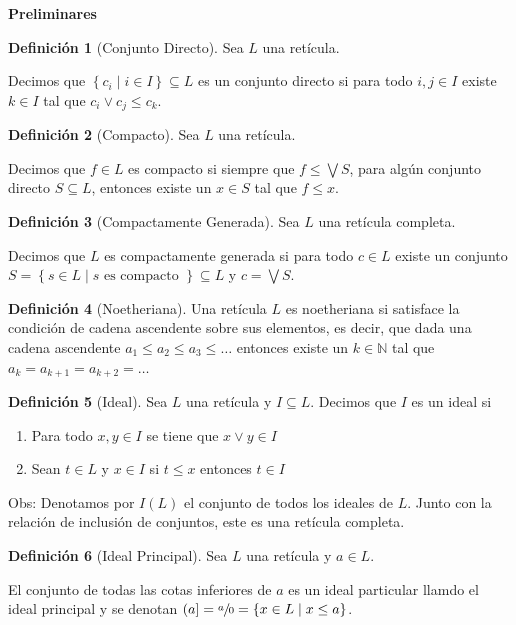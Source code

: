 \documentclass[12pt]{article}
\theoremstyle{plain}
\theoremstyle{definition}
\newtheorem{defi}{Definición}
\theoremstyle{plain}
\theoremstyle{plain}
\theoremstyle{plain}
\theoremstyle{remark}
\theoremstyle{remark}
\begin{document}
\begin{center}
    {\large \textbf{Preliminares}}
\end{center}

\begin{defi}[Conjunto Directo]
Sea $L$ una retícula.\par 
Decimos que $\left\{c_i\mid i\in I\right\}\subseteq L$ es un conjunto directo si para todo $i,j\in I$ existe $k\in I$ tal que $c_i\vee c_j\leq c_k$.
\end{defi}

\begin{defi}[Compacto]
Sea $L$ una retícula.\par 
Decimos que $f\in L$ es compacto si siempre que $f\leq\bigvee S$, para algún conjunto directo $S\subseteq L$, entonces existe un $x\in S$ tal que $f\leq x$.
\end{defi}

\begin{defi}[Compactamente Generada]
Sea $L$ una retícula completa.\par 
Decimos que $L$ es compactamente generada si para todo $c\in L$ existe un conjunto $S=\left\{s\in L\mid s\text{ es compacto }\right\}\subseteq L$ y $c=\bigvee S$.
\end{defi}

\begin{defi}[Noetheriana]
Una retícula $L$ es noetheriana si satisface la condición de cadena ascendente sobre sus elementos, es decir, que dada una cadena ascendente $a_1\leq a_2\leq a_3\leq\dots$ entonces existe un $k\in \mathbb{N}$ tal que $a_k=a_{k+1}=a_{k+2}=\dots$
\end{defi}


\begin{defi}[Ideal]
Sea $L$ una retícula y $I\subseteq L$. Decimos que $I$ es un ideal si
\begin{enumerate}
    \item Para todo $x,y\in I$ se tiene que $x\vee y\in I$
    \item Sean $t\in L$ y $x\in I$ si $t\leq x$ entonces $t\in I$
\end{enumerate}
\end{defi}

Obs: Denotamos por $I\left(L\right)$ el conjunto de todos los ideales de $L$. Junto con la relación de inclusión de conjuntos, este es una retícula completa.

\begin{defi}[Ideal Principal]
Sea $L$ una retícula y $a\in L$.\par 
El conjunto de todas las cotas inferiores de $a$ es un ideal particular llamdo el ideal principal y se denotan $(a]=\sfrac{a}{0}=\left\{x\in L\mid x\leq a\right\}$.
\end{defi}
\end{document}
